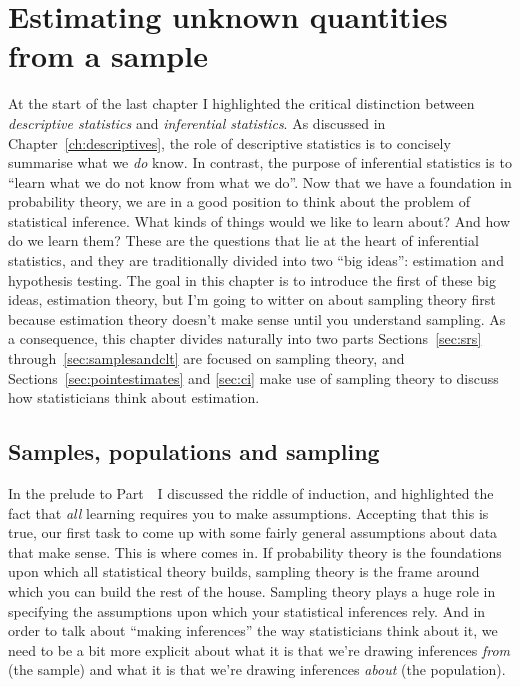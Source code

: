 
\chapter{Estimating unknown quantities from a sample\label{ch:estimation}}

 
At the start of the last chapter I highlighted the critical distinction between {\it descriptive statistics} and {\it inferential statistics}. As discussed in Chapter~\ref{ch:descriptives}, the role of descriptive statistics is to concisely summarise what we {\it do} know. In contrast, the purpose of inferential statistics is to ``learn what we do not know from what we do''. Now that we have a foundation in probability theory, we are in a good position to think about the problem of statistical inference. What kinds of things would we like to learn about? And how do we learn them? These are the questions that lie at the heart of inferential statistics, and they are traditionally divided into two ``big ideas'': estimation and hypothesis testing. The goal in this chapter is to introduce the first of these big ideas, estimation theory, but I'm going to witter on about sampling theory first because estimation theory doesn't make sense until you understand sampling. As a consequence, this chapter divides naturally into two parts Sections~\ref{sec:srs} through~\ref{sec:samplesandclt} are focused on sampling theory, and Sections~\ref{sec:pointestimates} and \ref{sec:ci} make use of sampling theory to discuss how statisticians think about estimation.


\section{Samples, populations and sampling~\label{sec:srs}}

In the prelude to Part~\thepart\ I discussed the riddle of induction, and highlighted the fact that {\it all} learning requires you to make assumptions. Accepting that this is true, our first task to come up with some fairly general assumptions about data that make sense. This is where  comes in. If probability theory is the foundations upon which all statistical theory builds, sampling theory is the frame around which you can build the rest of the house. Sampling theory plays a huge role in specifying the assumptions upon which your statistical inferences rely. And in order to talk about ``making inferences'' the way statisticians think about it, we need to be a bit more explicit about what it is that we're drawing inferences {\it from} (the sample) and what it is that we're drawing inferences {\it about} (the population).  

